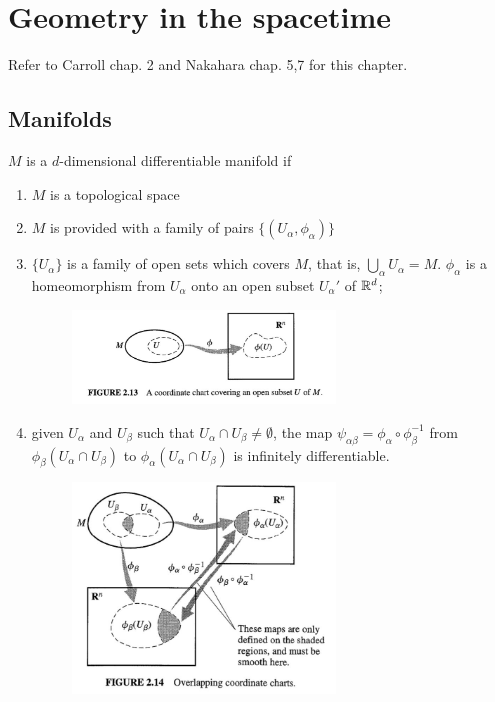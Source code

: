 \documentclass[../main/main.tex]{subfiles}
\begin{document}
\chapter{Geometry in the spacetime}
Refer to \textsf{Carroll chap. 2} and \textsf{Nakahara chap. 5,7} for this chapter.\\

\section{Manifolds}

\begin{definition}[Manifold]{}
$M$ is a $d$-dimensional differentiable manifold if
\begin{enumerate}
\item $M$ is a topological space
\item $M$ is provided with a family of pairs $\{(U_\alpha, \phi_\alpha)\}$
\item $\{U_\alpha\}$ is a family of open sets which covers $M$, that is,  $\bigcup_\alpha U_\alpha=M$. $\phi_\alpha$ is a homeomorphism from $U_\alpha$ onto an open subset $U_\alpha'$ of $\mathbb{R}^d$;  
\begin{figure}[H]
\centering
\includegraphics[width=7cm]{../img/chart-diff-geo.jpg}
\end{figure}
\item given $U_\alpha$ and $U_\beta$ such that $U_\alpha\cap U_\beta\neq\emptyset$, the map $\psi_{\alpha\beta}=\phi_\alpha\circ\phi_\beta^{-1}$ from $\phi_\beta(U_\alpha\cap U_\beta)$ to $\phi_\alpha(U_\alpha\cap U_\beta)$ is infinitely differentiable.
\begin{figure}[H]
\centering
\includegraphics[width=7cm]{../img/compatible-chart-diff-geo.jpg}

\end{figure}
\end{enumerate}
\end{definition}
\end{document}
